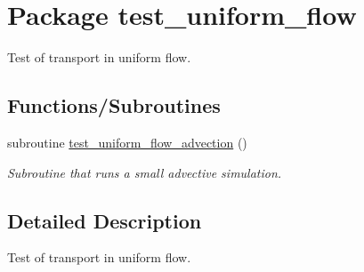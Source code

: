 \hypertarget{a00044}{
\section{Package test\_\-uniform\_\-flow}
\label{a00044}
}
Test of transport in uniform flow.  


\subsection*{Functions/Subroutines}
\begin{CompactItemize}
\item 
\hypertarget{a00044_4ed6cd7c20e89784745c217473bbd99d}{
subroutine \hyperlink{a00044_4ed6cd7c20e89784745c217473bbd99d}{test\_\-uniform\_\-flow\_\-advection} ()}
\label{a00044_4ed6cd7c20e89784745c217473bbd99d}

\begin{CompactList}\small\item\em Subroutine that runs a small advective simulation. \item\end{CompactList}\end{CompactItemize}


\subsection{Detailed Description}
Test of transport in uniform flow. 

